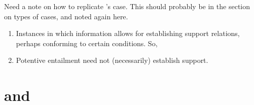 {
  \color{red}

  \begin{note}
    Need a note on how to replicate \citeauthor{Easwaran:2009tm}'s case.
    This should probably be in the section on types of cases, and noted again here.
  \end{note}
}

\begin{note}[Summary]
  \begin{enumerate}
  \item Instances in which information allows for establishing support relations, perhaps conforming to certain conditions. So,
  \item Potentive entailment need not (necessarily) establish support.
  \end{enumerate}
\end{note}

\section{\AR{} and \WR{}}
\label{sec:ar-wr}

